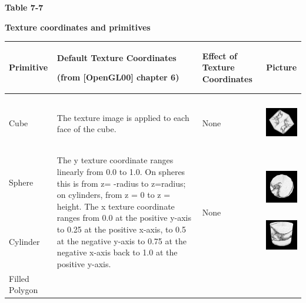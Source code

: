 \begin{center}
{\sffamily\bfseries Table 7-7}

{\sffamily\bfseries Texture coordinates and primitives}

\tablehead{}
\begin{supertabular}{|m{0.712in}|m{3.36in}|m{0.9in}|m{0.7in}|}
\hline
Primitive &
Default Texture Coordinates

(from [OpenGL00] chapter 6) &
Effect of Texture Coordinates &
Picture\\\hline
Cube &
The texture image is applied to each face of the cube.  &
None &
\begin{center}
\includegraphics[width=0.6602in,height=0.6602in]{ub-img/ub-img24.jpg}
\end{center}
\\\hline
Sphere

~

~

Cylinder &
The y texture coordinate ranges linearly from 0.0 to 1.0. On spheres
this is from\newline
z= -radius to z=radius; on cylinders, from\newline
z = 0 to z = height. The x texture coordinate ranges from 0.0 at the
positive y-axis to 0.25 at the positive x-axis, to 0.5 at the
negative\newline
y-axis to 0.75 at the negative x-axis back to 1.0 at the positive
y-axis.  &
None &


\begin{center}
\includegraphics[width=0.6602in,height=0.6602in]{ub-img/ub-img25.jpg}
\end{center}
\begin{center}
\includegraphics[width=0.6602in,height=0.6602in]{ub-img/ub-img26.jpg}
\end{center}
\\\hline
Filled Polygon


\end{supertabular}
\end{center}
